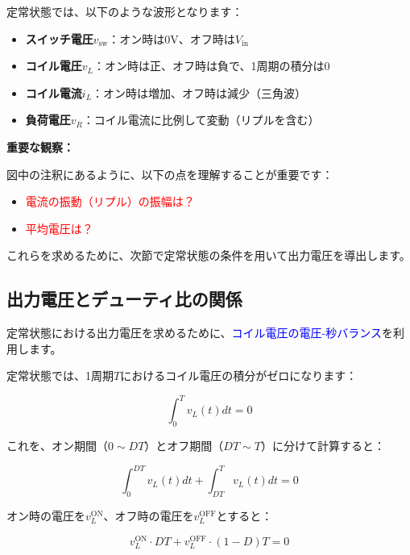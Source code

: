 定常状態では、以下のような波形となります：

\begin{itemize}
\item \textbf{スイッチ電圧$v_{\text{sw}}$}：オン時は0V、オフ時は$V_{\text{in}}$
\item \textbf{コイル電圧$v_L$}：オン時は正、オフ時は負で、1周期の積分は0
\item \textbf{コイル電流$i_L$}：オン時は増加、オフ時は減少（三角波）
\item \textbf{負荷電圧$v_R$}：コイル電流に比例して変動（リプルを含む）
\end{itemize}

\textbf{重要な観察：}

図中の注釈にあるように、以下の点を理解することが重要です：

\begin{itemize}
\item \textcolor{red}{電流の振動（リプル）の振幅は？}
\item \textcolor{red}{平均電圧は？}
\end{itemize}

これらを求めるために、次節で定常状態の条件を用いて出力電圧を導出します。

\subsection{出力電圧とデューティ比の関係}

定常状態における出力電圧を求めるために、\textcolor{blue}{コイル電圧の電圧-秒バランス}を利用します。

定常状態では、1周期$T$におけるコイル電圧の積分がゼロになります：

\begin{equation}
\int_0^T v_L(t)dt = 0
\end{equation}

これを、オン期間（$0 \sim DT$）とオフ期間（$DT \sim T$）に分けて計算すると：

\begin{equation}
\int_0^{DT} v_L(t)dt + \int_{DT}^{T} v_L(t)dt = 0
\end{equation}

オン時の電圧を$v_L^{\text{ON}}$、オフ時の電圧を$v_L^{\text{OFF}}$とすると：

\begin{equation}
v_L^{\text{ON}} \cdot DT + v_L^{\text{OFF}} \cdot (1-D)T = 0
\end{equation}

